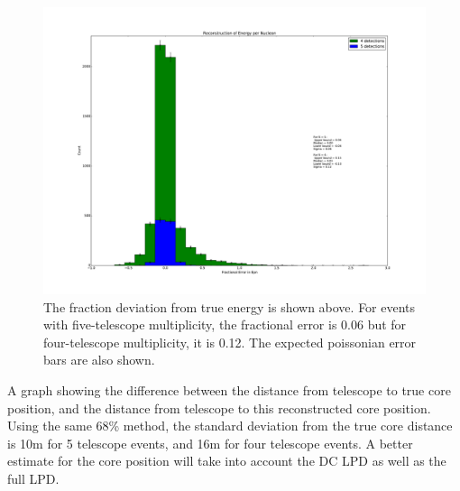 \documentclass[11pt]{article}
\begin{document}
\begin{figure}
\begin{center}
\includegraphics[width=\textwidth]{rawepn}
\caption{The fraction deviation from true energy is shown above. For events with five-telescope multiplicity, the fractional error is 0.06 but for four-telescope multiplicity, it is 0.12. The expected poissonian error bars are also shown.}
\label{fig:rawepn}
\end{center}
\end{figure}

A graph showing the difference between the distance from telescope to true core position, and the distance from telescope to this reconstructed core position. Using the same 68\% method, the standard deviation from the true core distance  is 10m for 5 telescope events, and 16m for four telescope events. A better estimate for the core position will take into account the DC LPD as well as the full LPD.
\end{document}
